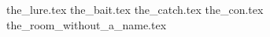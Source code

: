 %  
%  
%  
%  
%

{the_lure.tex}
{the_bait.tex}
{the_catch.tex}
{the_con.tex}
{the_room_without_a_name.tex}